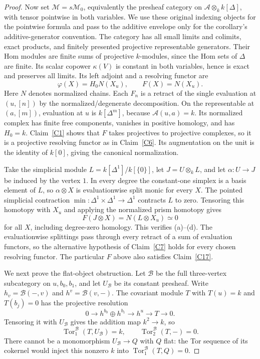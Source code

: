 \begin{proof}
Now set $\mathcal M=s\mathcal M_0$, equivalently the presheaf category on $\mathcal A\otimes_k k[\Delta]$, with tensor pointwise in both variables. We use these original indexing objects for the pointwise formula and pass to the additive envelope only for the corollary's additive-generator convention. The category has all small limits and colimits, exact products, and finitely presented projective representable generators. Their Hom modules are finite sums of projective $k$-modules, since the Hom sets of $\Delta$ are finite. Its scalar copower $\kappa(V)$ is constant in both variables, hence is exact and preserves all limits. Its left adjoint and a resolving functor are
\[
 \varphi(X)=H_0N(X_u),\qquad F(X)=N(X_u).
\]
Here $N$ denotes normalized chains. Each $F_n$ is a retract of the single evaluation at $(u,[n])$ by the normalized/degenerate decomposition. On the representable at $(a,[m])$, evaluation at $u$ is $k[\Delta^m]$, because $\mathcal A(u,a)=k$. Its normalized complex has finite free components, vanishes in positive homology, and has $H_0=k$. Claim~\ref{C1} shows that $F$ takes projectives to projective complexes, so it is a projective resolving functor as in Claim~\ref{C6}. Its augmentation on the unit is the identity of $k[0]$, giving the canonical normalization.

Take the simplicial module $L=k[\Delta^1]/k[\{0\}]$, let $J=U\otimes_k L$, and let $\alpha:U\to J$ be induced by the vertex $1$. In every degree the constant-one simplex is a basis element of $L$, so $\alpha\otimes X$ is evaluationwise split monic for every $X$. The pointed simplicial contraction $\min:\Delta^1\times\Delta^1\to\Delta^1$ contracts $L$ to zero. Tensoring this homotopy with $X_u$ and applying the normalized prism homotopy gives
\[
 F(J\otimes X)=N(L\otimes X_u)\simeq0
\]
for all $X$, including degree-zero homology. This verifies (a)--(d). The evaluationwise splittings pass through every retract of a sum of evaluation functors, so the alternative hypothesis of Claim~\ref{C7} holds for every chosen resolving functor. The particular $F$ above also satisfies Claim~\ref{C17}.

We next prove the flat-object obstruction. Let $\mathcal B$ be the full three-vertex subcategory on $u,b_0,b_1$, and let $U_{\mathcal B}$ be its constant presheaf. Write $h_v=\mathcal B(-,v)$ and $h^v=\mathcal B(v,-)$. The covariant module $T$ with $T(u)=k$ and $T(b_j)=0$ has the projective resolution
\[
 0\longrightarrow h^{b_0}\oplus h^{b_1}\longrightarrow h^u
 \longrightarrow T\longrightarrow0.
\]
Tensoring it with $U_{\mathcal B}$ gives the addition map $k^2\to k$, so
\[
 \operatorname{Tor}^{\mathcal B}_1(T,U_{\mathcal B})=k,
 \qquad \operatorname{Tor}^{\mathcal B}_2(T,-)=0.
\]
There cannot be a monomorphism $U_{\mathcal B}\to Q$ with $Q$ flat: the Tor sequence of its cokernel would inject this nonzero $k$ into $\operatorname{Tor}^{\mathcal B}_1(T,Q)=0$.


\end{proof}
